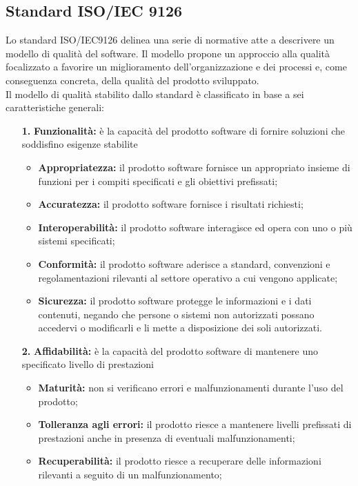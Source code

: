 \subsection{Standard ISO/IEC 9126}
\label{std9126}
Lo standard ISO\glossario{}/IEC\glossario{}9126 delinea una serie di normative atte a descrivere un modello di qualità del software. Il modello propone un approccio alla qualità focalizzato a favorire un miglioramento dell'organizzazione e dei processi e, come conseguenza concreta, della qualità del prodotto sviluppato.
\\Il modello di qualità stabilito dallo standard è classificato in base a sei caratteristiche generali:
\begin{itemize}
	\item[\textbf{1.}]\textbf{Funzionalità:} è la capacità del prodotto software di fornire soluzioni che soddisfino esigenze stabilite
	\begin{itemize}
		\item \textbf{Appropriatezza:} il prodotto software fornisce un appropriato insieme di funzioni per i compiti specificati e gli obiettivi prefissati;
		\item \textbf{Accuratezza:} il prodotto software fornisce i risultati richiesti;
		\item \textbf{Interoperabilità:} il prodotto software interagisce ed opera con uno o più sistemi specificati;
		\item \textbf{Conformità:} il prodotto software aderisce a standard, convenzioni e regolamentazioni rilevanti al settore operativo a cui vengono applicate;
		\item \textbf{Sicurezza:} il prodotto software protegge le informazioni e i dati contenuti, negando che persone o sistemi non autorizzati possano accedervi o modificarli e li mette a disposizione dei soli autorizzati.
	\end{itemize}
	\item[\textbf{2.}]\textbf{ Affidabilità:} è la capacità del prodotto software di mantenere uno specificato livello di prestazioni
	\begin{itemize}
		\item \textbf{Maturità:} non si verificano errori e malfunzionamenti durante l'uso del prodotto;
		\item \textbf{Tolleranza agli errori:} il prodotto riesce a mantenere livelli prefissati di prestazioni anche in presenza di eventuali malfunzionamenti;
		\item \textbf{Recuperabilità:} il prodotto riesce a recuperare delle informazioni rilevanti a seguito di un malfunzionamento;

\end{itemize}
\end{itemize}
